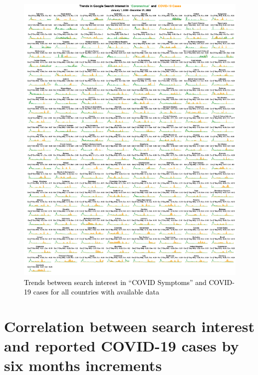 \documentclass{article}
\begin{document}
\begin{figure}[H]
    \includegraphics[width=1\textwidth]{figures/cases_vs_coronavirus_trends_allcountries.png}
    \caption{\textcolor{black}{Trends between search interest in ``COVID Symptoms'' and COVID-19 cases for all countries with available data}}
    \label{fig:cases_vs_coronavirus_trends_allcountries}
\end{figure}



\newpage
\section{Correlation between search interest and reported COVID-19 cases by six months increments}
\label{si:boxplot_halfyears}
\end{document}
